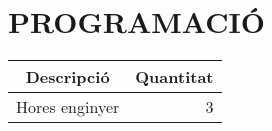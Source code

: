 \chapter{\uppercase{Programació}}

\begin{table}[H]
  \begin{center}
    \begin{tabularx} {\textwidth} {|X|r|} \hline
  \multicolumn{1}{|c|}{Descripció} &  \multicolumn{1}{c|}{Quantitat}\\ \hline \hline
    Hores enginyer & 3 \\ \hline
    \end{tabularx}%
  \end{center}

  \label{tab:addlabel}%
\end{table}%





\clearpage